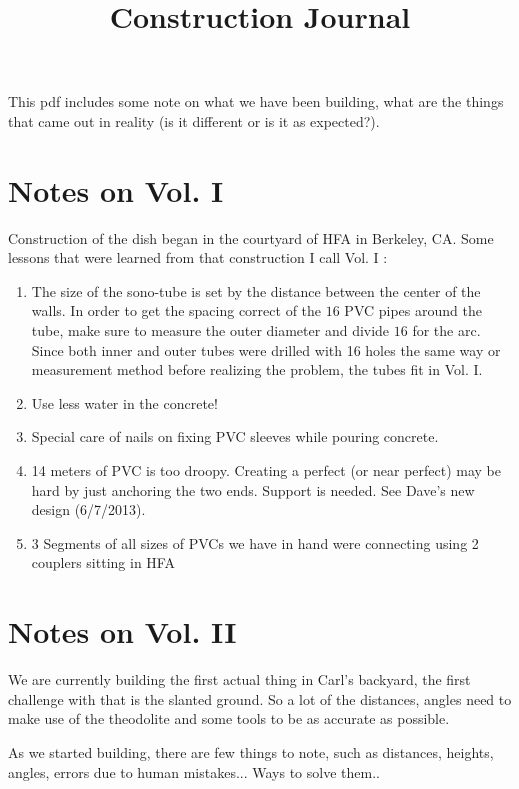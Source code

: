 \documentclass[12pt, letter]{article}
\begin{document}
\title{Construction Journal} \maketitle
This pdf includes some note on what we have been building, what are the things that came out in reality (is it different or is it as expected?).


\section{Notes on Vol. I}
Construction of the dish began in the courtyard of HFA in Berkeley, CA.
Some lessons that were learned from that construction I call Vol. I :
\begin{enumerate}
    \item{The size of the sono-tube is set by the distance between the center of
the walls. In order to get the spacing correct of the $16$ PVC pipes around the
tube, make sure to measure the outer diameter and divide $16$ for the arc. Since both inner
and outer tubes were drilled with 16 holes the same way or measurement
method before realizing the problem, the tubes fit in Vol. I.}
    \item{Use less water in the concrete!}
    \item{Special care of nails on fixing PVC sleeves while pouring concrete.}
    \item{14 meters of PVC is too droopy. Creating a perfect (or near perfect)
may be hard by just anchoring the two ends. Support is needed. See Dave's new
design (6/7/2013).}
    \item{3 Segments of all sizes of PVCs we have in hand were
      connecting using 2 couplers sitting in HFA}
\end{enumerate}

\section{Notes on Vol. II}
We are currently building the first actual thing in Carl's backyard, the first challenge with that is the slanted ground. So a lot of the distances, angles need to make use of the theodolite and some tools to be as accurate as possible.
 
As we started building, there are few things to note, such as distances, heights, angles, errors due to human mistakes... Ways to solve them..
\end{document}

